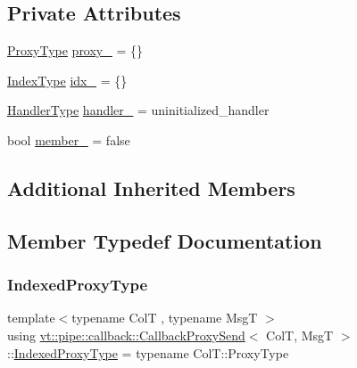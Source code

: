 \subsection*{Private Attributes}
\begin{DoxyCompactItemize}
\item 
\hyperlink{structvt_1_1pipe_1_1callback_1_1_callback_proxy_send_a2aece7c6f8bd17a4c0b1fdca75d84579}{Proxy\+Type} \hyperlink{structvt_1_1pipe_1_1callback_1_1_callback_proxy_send_a324fc5697bd625cf1a3f8961855886d9}{proxy\+\_\+} = \{\}
\item 
\hyperlink{structvt_1_1pipe_1_1callback_1_1_callback_proxy_send_adf233dca6b029304153ba59fecf6113f}{Index\+Type} \hyperlink{structvt_1_1pipe_1_1callback_1_1_callback_proxy_send_a1a9b4802acd720bc1fa50a7ebcb0c49e}{idx\+\_\+} = \{\}
\item 
\hyperlink{namespacevt_af64846b57dfcaf104da3ef6967917573}{Handler\+Type} \hyperlink{structvt_1_1pipe_1_1callback_1_1_callback_proxy_send_a913ed1823ba404d9f6675e8ef08bdca1}{handler\+\_\+} = uninitialized\+\_\+handler
\item 
bool \hyperlink{structvt_1_1pipe_1_1callback_1_1_callback_proxy_send_a4fb0eae323a12a03e25e5214ee4c7814}{member\+\_\+} = false
\end{DoxyCompactItemize}
\subsection*{Additional Inherited Members}


\subsection{Member Typedef Documentation}
\mbox{\label{structvt_1_1pipe_1_1callback_1_1_callback_proxy_send_a993aff1afaaf07a0d2c60a4ca96426f8}} 
\subsubsection{\texorpdfstring{Indexed\+Proxy\+Type}{IndexedProxyType}}
{\footnotesize\ttfamily template$<$typename ColT , typename MsgT $>$ \\
using \hyperlink{structvt_1_1pipe_1_1callback_1_1_callback_proxy_send}{vt\+::pipe\+::callback\+::\+Callback\+Proxy\+Send}$<$ ColT, MsgT $>$\+::\hyperlink{structvt_1_1pipe_1_1callback_1_1_callback_proxy_send_a993aff1afaaf07a0d2c60a4ca96426f8}{Indexed\+Proxy\+Type} =  typename Col\+T\+::\+Proxy\+Type}

